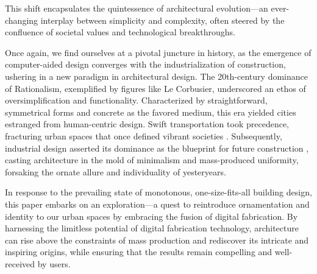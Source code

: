 This shift encapsulates the quintessence of architectural evolution—an ever-changing interplay between simplicity and complexity, often steered by the confluence of societal values and technological breakthroughs.

Once again, we find ourselves at a pivotal juncture in history, as the emergence of computer-aided design converges with the industrialization of construction, ushering in a new paradigm in architectural design. The 20th-century dominance of Rationalism, exemplified by figures like Le Corbusier, underscored an ethos of oversimplification and functionality. Characterized by straightforward, symmetrical forms and concrete as the favored medium, this era yielded cities estranged from human-centric design. Swift transportation took precedence, fracturing urban spaces that once defined vibrant societies \cite{Stacbond2020}. Subsequently, industrial design asserted its dominance as the blueprint for future construction \cite{Economakis2023}, casting architecture in the mold of minimalism and mass-produced uniformity, forsaking the ornate allure and individuality of yesteryears.

In response to the prevailing state of monotonous, one-size-fits-all building design, this paper embarks on an exploration—a quest to reintroduce ornamentation and identity to our urban spaces by embracing the fusion of digital fabrication. By harnessing the limitless potential of digital fabrication technology, architecture can rise above the constraints of mass production and rediscover its intricate and inspiring origins, while ensuring that the results remain compelling and well-received by users.

